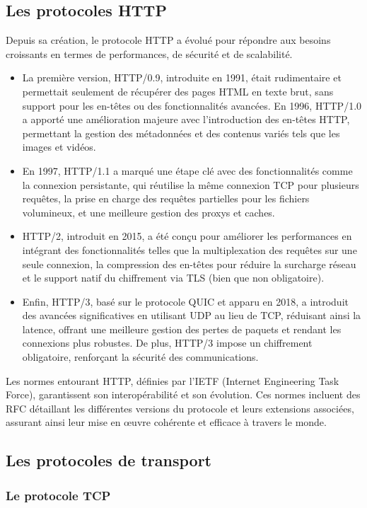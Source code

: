 \documentclass[a4paper,12pt]{article}
\begin{document}
\subsection{Les protocoles HTTP}
Depuis sa création, le protocole HTTP a évolué pour répondre aux besoins croissants en
termes de performances, de sécurité et de scalabilité.
\begin{itemize}
\item
La première version, HTTP/0.9, introduite en 1991, était rudimentaire et permettait
seulement de récupérer des pages HTML en texte brut, sans support pour les en-têtes ou
des fonctionnalités avancées. En 1996, HTTP/1.0 a apporté une amélioration majeure
avec l'introduction des en-têtes HTTP, permettant la gestion des métadonnées et des
contenus variés tels que les images et vidéos.  
\item
En 1997, HTTP/1.1 a marqué une étape clé
avec des fonctionnalités comme la connexion persistante, qui réutilise la même connexion
TCP pour plusieurs requêtes, la prise en charge des requêtes partielles pour les fichiers
volumineux, et une meilleure gestion des proxys et caches.
\item

HTTP/2, introduit en 2015, a
été conçu pour améliorer les performances en intégrant des fonctionnalités telles que la
multiplexation des requêtes sur une seule connexion, la compression des en-têtes pour
réduire la surcharge réseau et le support natif du chiffrement via TLS (bien que non
obligatoire). 
\item

Enfin, HTTP/3, basé sur le protocole QUIC et apparu en 2018, a introduit des
avancées significatives en utilisant UDP au lieu de TCP, réduisant ainsi la latence, offrant
une meilleure gestion des pertes de paquets et rendant les connexions plus robustes. De
plus, HTTP/3 impose un chiffrement obligatoire, renforçant la sécurité des
communications.
\end{itemize}
Les normes entourant HTTP, définies par l'IETF (Internet Engineering Task Force),
garantissent son interopérabilité et son évolution. Ces normes incluent des RFC détaillant
les différentes versions du protocole et leurs extensions associées, assurant ainsi leur
mise en œuvre cohérente et efficace à travers le monde.
\subsection{Les protocoles de transport}
\subsubsection {Le protocole TCP}
\end{document}
